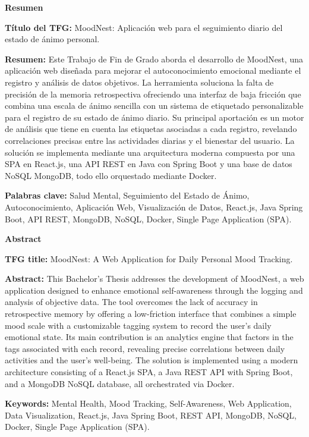\cleardoublepage
{}

{\Large \bfseries \noindent Resumen}
\vspace{1.5cm}

\noindent \textbf{Título del TFG:} MoodNest: Aplicación web para el seguimiento diario del estado de ánimo personal.
\vspace{0.4cm}

\noindent \textbf{Resumen:} Este Trabajo de Fin de Grado aborda el desarrollo de MoodNest, una aplicación web diseñada para mejorar el autoconocimiento emocional mediante el registro y análisis de datos objetivos. La herramienta soluciona la falta de precisión de la memoria retrospectiva ofreciendo una interfaz de baja fricción que combina una escala de ánimo sencilla con un sistema de etiquetado personalizable para el registro de su estado de ánimo diario. Su principal aportación es un motor de análisis que tiene en cuenta las etiquetas asociadas a cada registro, revelando correlaciones precisas entre las actividades diarias y el bienestar del usuario. La solución se implementa mediante una arquitectura moderna compuesta por una SPA en React.js, una API REST en Java con Spring Boot y una base de datos NoSQL MongoDB, todo ello orquestado mediante Docker.
\vspace{0.4cm}

\noindent \textbf{Palabras clave:} Salud Mental, Seguimiento del Estado de Ánimo, Autoconocimiento, Aplicación Web, Visualización de Datos, React.js, Java Spring Boot, API REST, MongoDB, NoSQL, Docker, Single Page Application (SPA).


\clearpage 



{\Large \bfseries \noindent Abstract}
\vspace{1.5cm}

\noindent \textbf{TFG title:} MoodNest: A Web Application for Daily Personal Mood Tracking.
\vspace{0.4cm}

\noindent \textbf{Abstract:} This Bachelor's Thesis addresses the development of MoodNest, a web application designed to enhance emotional self-awareness through the logging and analysis of objective data. The tool overcomes the lack of accuracy in retrospective memory by offering a low-friction interface that combines a simple mood scale with a customizable tagging system to record the user's daily emotional state. Its main contribution is an analytics engine that factors in the tags associated with each record, revealing precise correlations between daily activities and the user's well-being. The solution is implemented using a modern architecture consisting of a React.js SPA, a Java REST API with Spring Boot, and a MongoDB NoSQL database, all orchestrated via Docker.
\vspace{0.4cm}

\noindent \textbf{Keywords:} Mental Health, Mood Tracking, Self-Awareness, Web Application, Data Visualization, React.js, Java Spring Boot, REST API, MongoDB, NoSQL, Docker, Single Page Application (SPA).